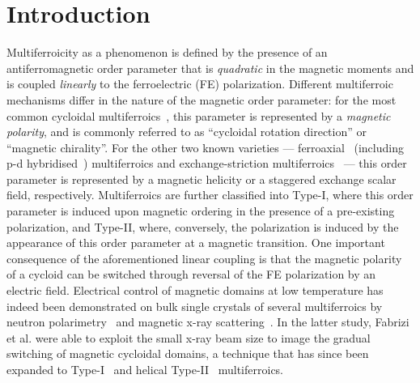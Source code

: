\documentclass[aps,prb,twocolumn,showpacs,superscriptaddress, longbibliography, 10pt]{revtex4-1}
\begin{document}

\maketitle

\section{Introduction}

Multiferroicity as a phenomenon is defined by the presence of an antiferromagnetic order parameter that is \emph{quadratic} in the magnetic moments and is coupled \emph{linearly} to the ferroelectric (FE) polarization. Different multiferroic mechanisms differ in the nature of the magnetic order parameter: for the most common cycloidal multiferroics~\cite{mostovoy2006ferroelectricity}, this parameter is represented by a \emph{magnetic polarity}, and is commonly referred to as ``cycloidal rotation direction'' or ``magnetic chirality''. For the other two known varieties --- ferroaxial~\cite{johnson2011cu}  (including p-d hybridised~\cite{arima2007ferroelectricity}) multiferroics and exchange-striction multiferroics~\cite{chapon2004structural} --- this order parameter is represented by a magnetic helicity or a staggered exchange scalar field, respectively. Multiferroics are further classified into Type-I, where this order parameter is induced upon magnetic ordering in the presence of a pre-existing polarization, and Type-II, where, conversely, the polarization is induced by the appearance of this order parameter at a magnetic transition. One important consequence of the aforementioned linear coupling is that the magnetic polarity of a cycloid can be switched through reversal of the FE polarization by an electric field. Electrical control of magnetic domains at low temperature has indeed been demonstrated on bulk single crystals of several multiferroics by neutron polarimetry~\cite{radaelli2008electric, yamasaki2007electric, cabrera2009coupled} and magnetic x-ray scattering~\cite{fabrizi2010electric}. In the latter study, Fabrizi et al. were able to exploit the small x-ray beam size to image the gradual switching of magnetic cycloidal domains, a technique that has since been expanded to Type-I~\cite{johnson2013x} and helical Type-II~\cite{hiraoka2011spin} multiferroics.
\end{document}
